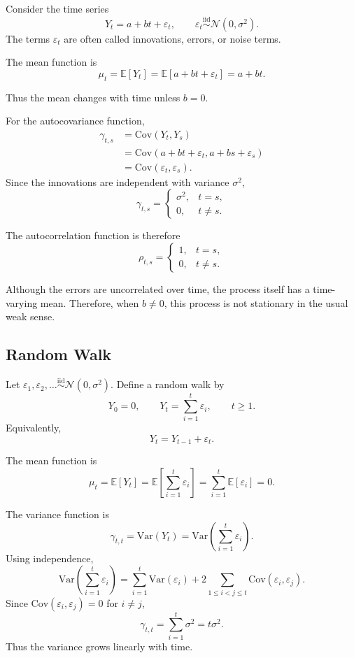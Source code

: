 \documentclass[12pt,oneside]{book}
\numberwithin{equation}{section}
\theoremstyle{definition}
\theoremstyle{plain}
\theoremstyle{remark}
\newcommand{\E}{\mathbb{E}}
\newcommand{\Var}{\mathrm{Var}}
\newcommand{\Cov}{\mathrm{Cov}}
\newcommand{\iid}{\overset{\text{iid}}{\sim}}
\newcommand{\Normal}{\mathcal{N}}
\begin{document}
Consider the time series
\[
Y_t = a+bt+\varepsilon_t,
\qquad
\varepsilon_t \iid \Normal(0,\sigma^2).
\]
The terms $\varepsilon_t$ are often called innovations, errors, or noise terms.

The mean function is
\[
\mu_t
=
\E[Y_t]
=
\E[a+bt+\varepsilon_t]
=
a+bt.
\]

Thus the mean changes with time unless $b=0$.

For the autocovariance function,
\begin{align*}
\gamma_{t,s}
&=
\Cov(Y_t,Y_s) \\
&=
\Cov(a+bt+\varepsilon_t,a+bs+\varepsilon_s) \\
&=
\Cov(\varepsilon_t,\varepsilon_s).
\end{align*}
Since the innovations are independent with variance $\sigma^2$,
\[
\gamma_{t,s}
=
\begin{cases}
\sigma^2, & t=s,\\
0, & t\neq s.
\end{cases}
\]

The autocorrelation function is therefore
\[
\rho_{t,s}
=
\begin{cases}
1, & t=s,\\
0, & t\neq s.
\end{cases}
\]

Although the errors are uncorrelated over time, the process itself has a time-varying mean. Therefore, when $b\neq 0$, this process is not stationary in the usual weak sense.

\subsection*{Random Walk}

Let $\varepsilon_1,\varepsilon_2,\ldots \iid \Normal(0,\sigma^2)$. Define a random walk by
\[
Y_0=0,
\qquad
Y_t=\sum_{i=1}^t \varepsilon_i,
\qquad t\geq 1.
\]
Equivalently,
\[
Y_t=Y_{t-1}+\varepsilon_t.
\]

The mean function is
\[
\mu_t
=
\E[Y_t]
=
\E\left[\sum_{i=1}^t \varepsilon_i\right]
=
\sum_{i=1}^t \E[\varepsilon_i]
=
0.
\]

The variance function is
\[
\gamma_{t,t}
=
\Var(Y_t)
=
\Var\left(\sum_{i=1}^t \varepsilon_i\right).
\]
Using independence,
\[
\Var\left(\sum_{i=1}^t \varepsilon_i\right)
=
\sum_{i=1}^t \Var(\varepsilon_i)
+
2\sum_{1\leq i<j\leq t}\Cov(\varepsilon_i,\varepsilon_j).
\]
Since $\Cov(\varepsilon_i,\varepsilon_j)=0$ for $i\neq j$,
\[
\gamma_{t,t}
=
\sum_{i=1}^t \sigma^2
=
t\sigma^2.
\]
Thus the variance grows linearly with time.
\end{document}
